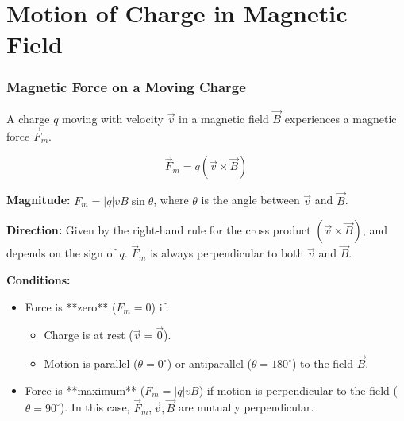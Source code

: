 \section{Motion of Charge in Magnetic Field}

\transfade[duration=0.5]

\begin{frame}[t]
    \frametitle{\textcolor{deepnavy}{\textbf{Magnetic Force on a Moving Charge}}}
    \renewcommand{\familydefault}{\rmdefault}
    \small

      \item<+-> A charge $q$ moving with velocity $\vec{v}$ in a magnetic field $\vec{B}$ experiences a magnetic force $\vec{F}_m$.
        \begin{tcolorbox}[colback=orange!8,colframe=accentorange,boxrule=0.5pt,arc=1mm,boxsep=2pt]
        \begin{equation*}
             \vec{F}_m = q (\vec{v} \times \vec{B})
        \end{equation*}
          \end{tcolorbox}

      \item<+-> \textbf{Magnitude:} $F_m = |q| v B \sin\theta$, where $\theta$ is the angle between $\vec{v}$ and $\vec{B}$.
    \item<+-> \textbf{Direction:} Given by the right-hand rule for the cross product $(\vec{v} \times \vec{B})$, and depends on the sign of $q$.   $\vec{F}_m$ is always perpendicular to both $\vec{v}$ and $\vec{B}$.

    \item<+-> \textbf{Conditions:}
        \begin{itemize}[<+->]
              \item Force is **zero** ($F_m = 0$) if:
                \begin{itemize}
                      \item Charge is at rest ($\vec{v} = \vec{0}$).
                      \item Motion is parallel ($\theta = 0^\circ$) or antiparallel ($\theta = 180^\circ$) to the field $\vec{B}$.
                \end{itemize}
              \item Force is **maximum** ($F_m = |q|vB$) if motion is perpendicular to the field ($\theta = 90^\circ$).   In this case, $\vec{F}_m, \vec{v}, \vec{B}$ are mutually perpendicular.
        \end{itemize}


\end{frame}
